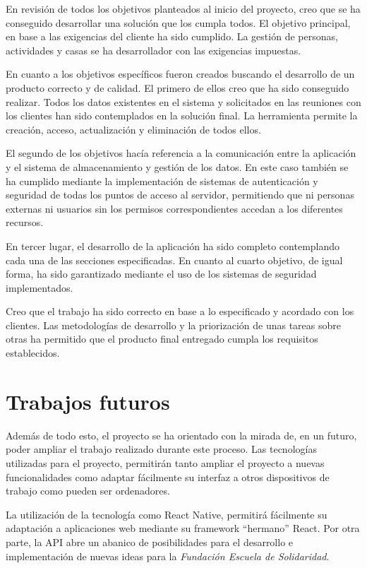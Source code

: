 En revisión de todos los objetivos planteados al inicio del proyecto, creo que se ha conseguido desarrollar una solución que los cumpla todos. El objetivo principal, en base a las exigencias del cliente ha sido cumplido. La gestión de personas, actividades y casas se ha desarrollador con las exigencias impuestas.

En cuanto a los objetivos específicos fueron creados buscando el desarrollo de un producto correcto y de calidad. El primero de ellos creo que ha sido conseguido realizar. Todos los datos existentes en el sistema y solicitados en las reuniones con los clientes han sido contemplados en la solución final. La herramienta permite la creación, acceso, actualización y eliminación de todos ellos.

El segundo de los objetivos hacía referencia a la comunicación entre la aplicación y el sistema de almacenamiento y gestión de los datos. En este caso también se ha cumplido mediante la implementación de sistemas de autenticación y seguridad de todas los puntos de acceso al servidor, permitiendo que ni personas externas ni usuarios sin los permisos correspondientes accedan a los diferentes recursos.

En tercer lugar, el desarrollo de la aplicación ha sido completo contemplando cada una de las secciones especificadas. En cuanto al cuarto objetivo, de igual forma, ha sido garantizado mediante el uso de los sistemas de seguridad implementados.

Creo que el trabajo ha sido correcto en base a lo especificado y acordado con los clientes. Las metodologías de desarrollo y la priorización de unas tareas sobre otras ha permitido que el producto final entregado cumpla los requisitos establecidos.

\section{Trabajos futuros}

Además de todo esto, el proyecto se ha orientado con la mirada de, en un futuro, poder ampliar el trabajo realizado durante este proceso. Las tecnologías utilizadas para el proyecto, permitirán tanto ampliar el proyecto a nuevas funcionalidades como adaptar fácilmente su interfaz a otros dispositivos de trabajo como pueden ser ordenadores.

La utilización de la tecnología como React Native, permitirá fácilmente su adaptación a aplicaciones web mediante su framework ``hermano'' React. Por otra parte, la API abre un abanico de posibilidades para el desarrollo e implementación de nuevas ideas para la \textit{Fundación Escuela de Solidaridad}.